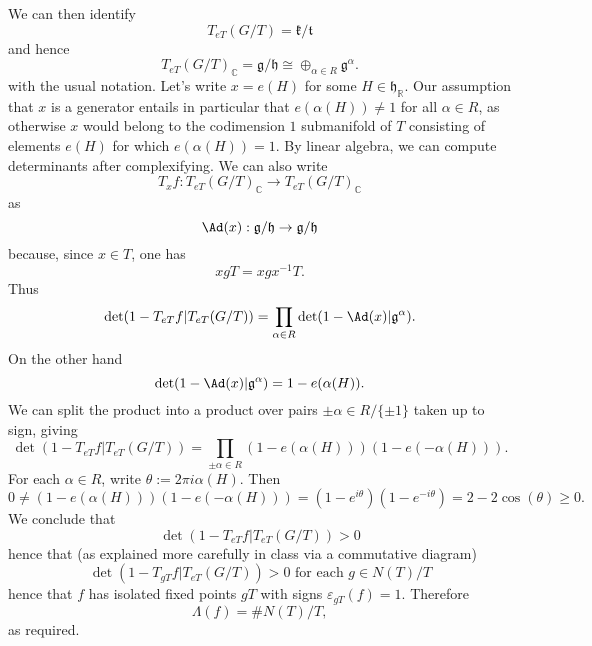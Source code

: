 \documentclass[reqno]{amsart} 
\def\eps{\varepsilon}
\begin{document}
We can then identify
\begin{equation*}
  T_{e T}(G/T) = \mathfrak{k} / \mathfrak{t}
\end{equation*}
and hence
\begin{equation*}
  T_{e T}(G/T)_{\mathbb{C}} = \mathfrak{g} / \mathfrak{h} \cong \oplus_{\alpha \in R} \mathfrak{g}^\alpha.
\end{equation*}
with the usual notation.  Let's write $x = e(H)$ for some $H \in \mathfrak{h}_\mathbb{R}$.  Our assumption that $x$ is a generator entails in particular that $e(\alpha(H)) \neq 1$ for all $\alpha \in R$, as otherwise $x$ would belong to the codimension $1$ submanifold of $T$ consisting of elements $e(H)$ for which $e(\alpha(H)) = 1$.  By linear algebra, we can compute determinants after complexifying.  We can also write
\begin{equation*}
  T_x f : T_{e T}(G/T)_{\mathbb{C}} \rightarrow T_{e T}(G/T) _{\mathbb{C}}
\end{equation*}
as
\begin{equation*}
  \Ad(x) : \mathfrak{g}/\mathfrak{h} \rightarrow \mathfrak{g}/\mathfrak{h}
\end{equation*}
because, since $x \in T$, one has
\begin{equation*}
  x g T = x g x^{-1} T.
\end{equation*}
Thus
\begin{equation*}
  \det(1 - T_{e T} f | T_{e T}(G/T)) = \prod_{\alpha \in R} \det(1 - \Ad(x) | \mathfrak{g}^\alpha).
\end{equation*}
On the other hand
\begin{equation*}
  \det(1 - \Ad(x) | \mathfrak{g}^\alpha) = 1 - e(\alpha(H)).
\end{equation*}
We can split the product into a product over pairs $\pm \alpha \in R / \{\pm 1\}$ taken up to sign, giving
\begin{equation*}
  \det(1 - T_{e T} f | T_{e T}(G/T)) = \prod_{\pm \alpha \in R} (1 - e(\alpha(H))) (1 - e(-\alpha(H))).
\end{equation*}
For each $\alpha \in R$, write $\theta := 2 \pi i \alpha(H)$.  Then
\begin{equation*}
  0 \neq (1 - e(\alpha(H))) (1 - e(-\alpha(H))) = (1 - e^{i \theta}) (1 - e^{-i \theta}) = 2 - 2 \cos(\theta) \geq 0.
\end{equation*}
We conclude that
\begin{equation*}
  \det(1 - T_{e T} f | T_{e T}(G/T)) > 0
\end{equation*}
hence that (as explained more carefully in class via a commutative diagram)
\begin{equation*}
  \det(1 - T_{g T} f | T_{e T}(G/T)) > 0 \text{ for each } g \in N(T)/T
\end{equation*}
hence that $f$ has isolated fixed points $g T$ with signs $\eps_{g T}(f) = 1$.  Therefore
\begin{equation*}
  \Lambda(f) = \# N(T)/T,
\end{equation*}
as required.
\end{document}
